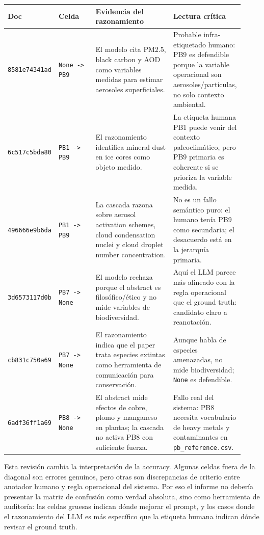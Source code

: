 \begin{center}
\scriptsize
\setlength{\tabcolsep}{4pt}
\renewcommand{\arraystretch}{1.18}
\begin{tabular}{p{0.13\linewidth}p{0.17\linewidth}p{0.36\linewidth}p{0.26\linewidth}}
\toprule
Doc & Celda & Evidencia del razonamiento & Lectura crítica \\
\midrule
\texttt{8581e74341ad} & \texttt{None -> PB9} & El modelo cita PM2.5, black carbon y AOD como variables medidas para estimar aerosoles superficiales. & Probable infra-etiquetado humano: PB9 es defendible porque la variable operacional son aerosoles/partículas, no solo contexto ambiental. \\
\texttt{6c517c5bda80} & \texttt{PB1 -> PB9} & El razonamiento identifica mineral dust en ice cores como objeto medido. & La etiqueta humana PB1 puede venir del contexto paleoclimático, pero PB9 primaria es coherente si se prioriza la variable medida. \\
\texttt{496666e9b6da} & \texttt{PB1 -> PB9} & La cascada razona sobre aerosol activation schemes, cloud condensation nuclei y cloud droplet number concentration. & No es un fallo semántico puro: el humano tenía PB9 como secundaria; el desacuerdo está en la jerarquía primaria. \\
\texttt{3d6573117d0b} & \texttt{PB7 -> None} & El modelo rechaza porque el abstract es filosófico/ético y no mide variables de biodiversidad. & Aquí el LLM parece más alineado con la regla operacional que el ground truth: candidato claro a reanotación. \\
\texttt{cb831c750a69} & \texttt{PB7 -> None} & El razonamiento indica que el paper trata especies extintas como herramienta de comunicación para conservación. & Aunque habla de especies amenazadas, no mide biodiversidad; \texttt{None} es defendible. \\
\texttt{6adf36ff1a69} & \texttt{PB8 -> None} & El abstract mide efectos de cobre, plomo y manganeso en plantas; la cascada no activa PB8 con suficiente fuerza. & Fallo real del sistema: PB8 necesita vocabulario de heavy metals y contaminantes en \texttt{pb\_reference.csv}. \\
\bottomrule
\end{tabular}
\end{center}

Esta revisión cambia la interpretación de la accuracy. Algunas celdas fuera de la diagonal son errores genuinos, pero otras son discrepancias de criterio entre anotador humano y regla operacional del sistema. Por eso el informe no debería presentar la matriz de confusión como verdad absoluta, sino como herramienta de auditoría: las celdas gruesas indican dónde mejorar el prompt, y los casos donde el razonamiento del LLM es más específico que la etiqueta humana indican dónde revisar el ground truth.

